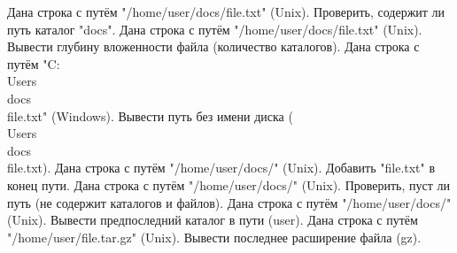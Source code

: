 Дана строка с путём "/home/user/docs/file.txt" (Unix). Проверить, содержит ли путь каталог "docs".
Дана строка с путём "/home/user/docs/file.txt" (Unix). Вывести глубину вложенности файла (количество каталогов).
Дана строка с путём "C:\\Users\\docs\\file.txt" (Windows). Вывести путь без имени диска (\\Users\\docs\\file.txt).
Дана строка с путём "/home/user/docs/" (Unix). Добавить "file.txt" в конец пути.
Дана строка с путём "/home/user/docs/" (Unix). Проверить, пуст ли путь (не содержит каталогов и файлов).
Дана строка с путём "/home/user/docs/" (Unix). Вывести предпоследний каталог в пути (user).
Дана строка с путём "/home/user/file.tar.gz" (Unix). Вывести последнее расширение файла (gz).
